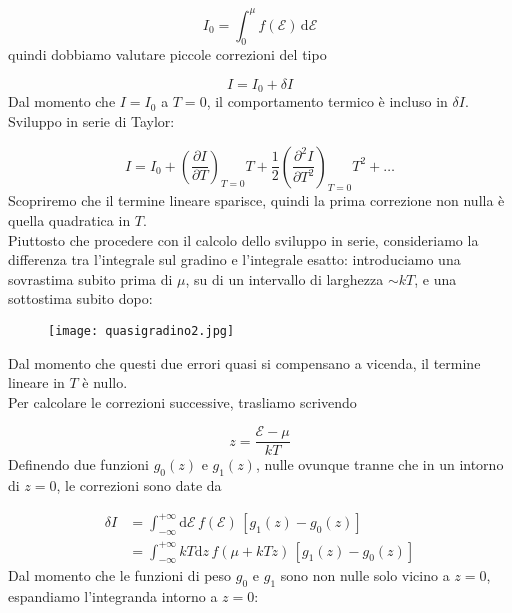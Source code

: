 \documentclass[a4paper]{report}
\begin{document}
\begin{equation}
    I_0 = \int_{0}^{\mu} f(\mathcal{E})\,\mathrm{d}\mathcal{E}
\end{equation}
quindi dobbiamo valutare piccole correzioni del tipo

\begin{equation}
    I = I_0 + \delta I
\end{equation}
Dal momento che $I = I_0$ a $T=0$, il comportamento termico è incluso in $\delta I$. Sviluppo in serie di Taylor:

\begin{equation}
    I = I_0 + \left(\frac{\partial I}{\partial T }\right)_{T=0} T + \frac{1}{2}\left(\frac{\partial^2 I}{\partial T^2}\right)_{T=0} T^2 + \dots
\end{equation}
Scopriremo che il termine lineare sparisce, quindi la prima correzione non nulla è quella quadratica in $T$. \\
Piuttosto che procedere con il calcolo dello sviluppo in serie, consideriamo la differenza tra l'integrale sul gradino e l'integrale esatto: introduciamo una sovrastima subito prima di $\mu$, su di un intervallo di larghezza $\sim k T$, e una sottostima subito dopo:

\begin{figure}[h!]
    \centering
    \texttt{[image: quasigradino2.jpg]}
    \label{fig:my_label}
\end{figure}
Dal momento che questi due errori quasi si compensano a vicenda, il termine lineare in $T$ è nullo. \\
Per calcolare le correzioni successive, trasliamo scrivendo

\begin{equation}
    z = \frac{\mathcal{E}-\mu}{k T}
\end{equation}
Definendo due funzioni $g_0(z)$ e $g_1(z)$, nulle ovunque tranne che in un intorno di $z=0$, le correzioni sono date da 

\begin{equation}
    \begin{split}
        \delta I & = \int_{-\infty}^{+\infty} \mathrm{d}\mathcal{E} \, f(\mathcal{E})\, [g_1(z)-g_0(z)] \\
        & = \int_{-\infty}^{+\infty}  k T \mathrm{d}z\,f(\mu + k T z)\, [g_1(z)-g_0(z)]
    \end{split}
\end{equation}
Dal momento che le funzioni di peso $g_0$ e $g_1$ sono non nulle solo vicino a $z=0$, espandiamo l'integranda intorno a $z=0$:
\end{document}
